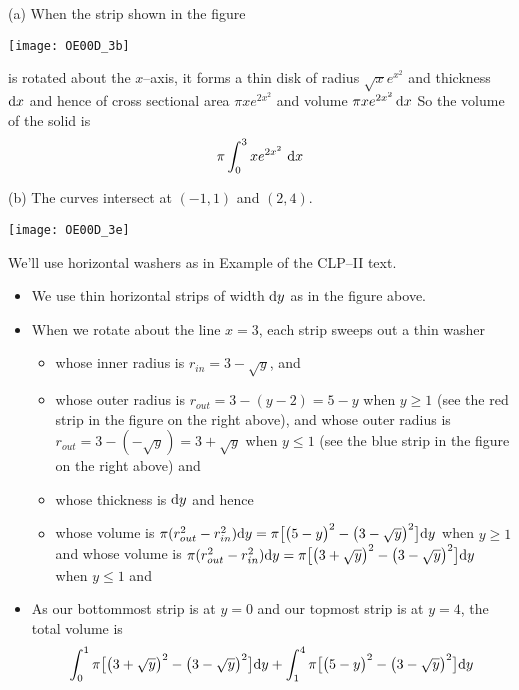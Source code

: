 \begin{solution} (a)
When the strip shown in the figure
\begin{center}
       \texttt{[image: OE00D\_3b]}
\end{center}

\noindent  is rotated about the $x$--axis, it
forms a thin disk of radius $\sqrt{x}e^{x^2}$  and thickness $\mathrm{d}x$
and hence of cross sectional area $\pi xe^{2x^2}$ and volume $\pi xe^{2x^2}\,\mathrm{d}x$
So the volume of the solid is
\begin{align*}
\pi\int_{0}^{3} xe^{2x^2}\ \mathrm{d}x
\end{align*}


\noindent (b)
The curves intersect at $(-1,1)$ and $(2,4)$.

\begin{center}
       \texttt{[image: OE00D\_3e]}
\end{center}

\noindent
We'll use horizontal washers as in Example  
of the %
CLP--II text.
 \begin{itemize}
\item We use thin horizontal  strips of width $\mathrm{d}y$ as in the figure  above.

\item When we rotate about the line $x=3$, each strip
sweeps out a thin washer
\begin{itemize}
\item
whose inner radius is $r_{in}=3-\sqrt{y}$, and
\item
whose outer radius is $r_{out}=3-(y-2)=5-y$ when $y\ge 1$
(see the red strip in the figure on the right above),  and
whose outer radius is $r_{out}= 3-(-\sqrt{y})=3+\sqrt{y}$ when $y\le 1$
(see the blue strip in the figure on the right above) and
\item
whose thickness is $\mathrm{d}y$ and hence
\item
whose volume is
$\pi(r_{out}^2 - r_{in}^2)\mathrm{d}y
       = \pi\big[\big(5-y\big)^2-\big(3-\sqrt{y}\big)^2\big]\mathrm{d}y$
when $y\ge 1$ and  whose volume is
$\pi(r_{out}^2 - r_{in}^2)\mathrm{d}y
    =\pi\big[\big(3+\sqrt{y}\big)^2-\big(3-\sqrt{y}\big)^2\big]\mathrm{d}y$
when $y\le 1$ and

\end{itemize}
\item As our bottommost strip is at $y=0$ and our topmost
strip is at $y=4$, the total volume is
\begin{align*}
\int _0^1  \pi\big[\big(3+\sqrt{y}\big)^2-\big(3-\sqrt{y}\big)^2\big]\mathrm{d}y
+\int _ 1^4  \pi\big[\big(5-y\big)^2-\big(3-\sqrt{y}\big)^2\big]\mathrm{d}y
\end{align*}
\end{itemize}

\end{solution}

